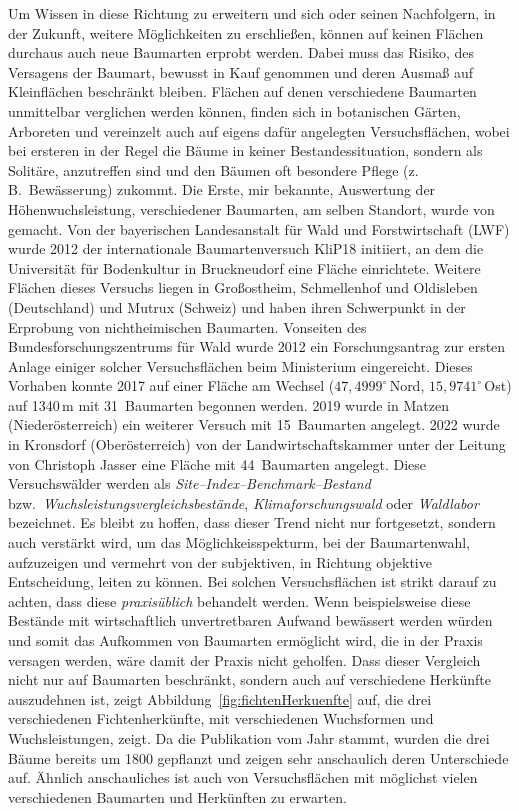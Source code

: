 \documentclass[twocolumn]{scrartcl}
\begin{document}
Um Wissen in diese Richtung zu erweitern und sich oder seinen Nachfolgern, in
der Zukunft, weitere Möglichkeiten zu erschließen, können auf keinen Flächen
durchaus auch neue Baumarten erprobt werden. Dabei muss das Risiko, des
Versagens der Baumart, bewusst in Kauf genommen und deren Ausmaß auf
Kleinflächen beschränkt bleiben. Flächen auf denen verschiedene Baumarten
unmittelbar verglichen werden können, finden sich in botanischen Gärten,
Arboreten und vereinzelt auch auf eigens dafür angelegten Versuchsflächen, wobei
bei ersteren in der Regel die Bäume in keiner Bestandessituation, sondern als
Solitäre, anzutreffen sind und den Bäumen oft besondere Pflege (z.\,B.\
Bewässerung) zukommt. Die Erste, mir bekannte, Auswertung der
Höhenwuchsleistung, verschiedener Baumarten, am selben Standort, wurde von
\cite{mayer1970anbauversuch} gemacht. Von der bayerischen Landesanstalt für Wald
und Forstwirtschaft (LWF) wurde 2012 der internationale Baumartenversuch KliP18
initiiert, an dem die Universität für Bodenkultur in Bruckneudorf eine Fläche
einrichtete. Weitere Flächen dieses Versuchs liegen in Großostheim, Schmellenhof
und Oldisleben (Deutschland) und Mutrux (Schweiz) und haben ihren Schwerpunkt in
der Erprobung von nichtheimischen Baumarten. Vonseiten des
Bundesforschungszentrums für Wald wurde 2012 ein Forschungsantrag zur ersten
Anlage einiger solcher Versuchsflächen beim Ministerium eingereicht. Dieses
Vorhaben konnte 2017 auf einer Fläche am Wechsel ($47,4999^{\circ}$\,Nord,
$15,9741^{\circ}$\,Ost) auf 1340\,m mit 31~Baumarten begonnen werden. 2019 wurde
in Matzen (Niederösterreich) ein weiterer Versuch mit 15~Baumarten angelegt.
2022 wurde in Kronsdorf (Oberösterreich) von der Landwirtschaftskammer unter der
Leitung von Christoph Jasser eine Fläche mit 44~Baumarten angelegt. Diese
Versuchswälder werden als \emph{Site--Index--Benchmark--Bestand} bzw.\
\emph{Wuchsleistungsvergleichsbestände}, \emph{Klimaforschungswald} oder
\emph{Waldlabor} bezeichnet. Es bleibt zu hoffen, dass dieser Trend nicht nur
fortgesetzt, sondern auch verstärkt wird, um das Möglichkeisspekturm, bei der
Baumartenwahl, aufzuzeigen und vermehrt von der subjektiven, in Richtung
objektive Entscheidung, leiten zu können. Bei solchen Versuchsflächen ist strikt
darauf zu achten, dass diese \emph{praxisüblich} behandelt werden. Wenn
beispielsweise diese Bestände mit wirtschaftlich unvertretbaren Aufwand
bewässert werden würden und somit das Aufkommen von Baumarten ermöglicht wird,
die in der Praxis versagen werden, wäre damit der Praxis nicht geholfen. Dass
dieser Vergleich nicht nur auf Baumarten beschränkt, sondern auch auf
verschiedene Herkünfte auszudehnen ist, zeigt
Abbildung~\ref{fig:fichtenHerkuenfte}
\citep[S.~86]{hegi1906IllustrierteFloraBd1} auf, die drei verschiedenen
Fichtenherkünfte, mit verschiedenen Wuchsformen und Wuchsleistungen, zeigt. Da
die Publikation vom Jahr \citeyear{hegi1906IllustrierteFloraBd1} stammt, wurden
die drei Bäume bereits um 1800 gepflanzt und zeigen sehr anschaulich deren
Unterschiede auf. Ähnlich anschauliches ist auch von Versuchsflächen mit
möglichst vielen verschiedenen Baumarten und Herkünften zu erwarten.
\end{document}

